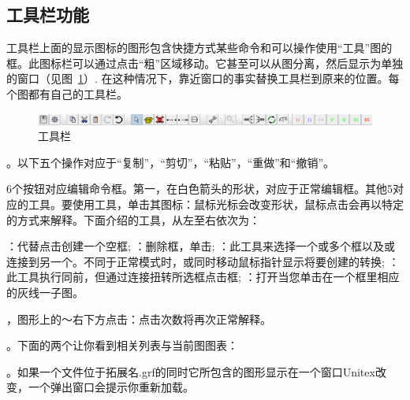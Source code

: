 \subsection{工具栏功能}
\label{toolbar-commands}

工具栏上面的显示图标的图形包含快捷方式某些命令和可以操作使用“工具”图的框。此图标栏可以通过点击“粗”区域移动。它甚至可以从图分离，然后显示为单独的窗口（见图~\ref{fig-toolbar}）.
在这种情况下，靠近窗口的事实替换工具栏到原来的位置。每个图都有自己的工具栏。
\begin{figure}[!ht]
\begin{center}
\includegraphics[width=15cm]{resources/img/fig5-20.png}
\caption{工具栏\label{fig-toolbar}}
\end{center}
\end{figure}

\bigskip
{}。以下五个操作对应于“复制”，“剪切”，“粘贴”，“重做”和“撤销”。

\bigskip
{}6个按钮对应编辑命令框。第一，在白色箭头的形状，对应于正常编辑框。其他5对应的工具。要使用工具，单击其图标：鼠标光标会改变形状，鼠标点击会再以特定的方式来解释。下面介绍的工具，从左至右依次为：

\begin{itemize}
  ：代替点击创建一个空框;
  ：删除框，单击;
  ：此工具来选择一个或多个框以及或连接到另一个。不同于正常模式时，或同时移动鼠标指针显示将要创建的转换;  ：此工具执行同前，但通过连接扭转所选框点击框;
  ：打开当您单击在一个框里相应的灰线一子图。
\end{itemize}

，图形上的〜右下方点击：点击次数将再次正常解释。

\bigskip
{}。下面的两个让你看到相关列表与当前图图表：

\begin{itemize}
\end{itemize}

。如果一个文件位于拓展名\verb++.grf的同时它所包含的图形显示在一个窗口Unitex改变，一个弹出窗口会提示你重新加载。

